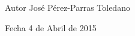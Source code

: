 \begin{DoxyAuthor}{Autor}
José Pérez-\/\+Parras Toledano 
\end{DoxyAuthor}
\begin{DoxyDate}{Fecha}
4 de Abril de 2015 
\end{DoxyDate}
